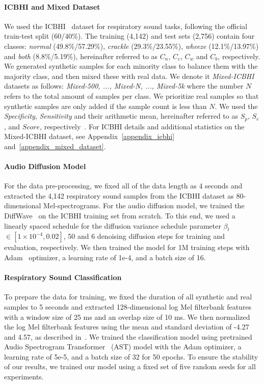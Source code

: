 \documentclass{article}
\begin{document}
\paragraph{ICBHI and Mixed Dataset} We used the ICBHI~\cite{rocha2018alpha} dataset for respiratory sound tasks, following the official train-test split (60/40\%). 
The training (4,142) and test sets (2,756) contain four classes: \emph{normal} (49.8\%/57.29\%), \emph{crackle} (29.3\%/23.55\%), \emph{wheeze} (12.1\%/13.97\%) and \emph{both} (8.8\%/5.19\%), hereinafter referred to as $C_{n}$, $C_{c}$, $C_{w}$ and $C_{b}$, respectively.
We generated synthetic samples for each minority class to balance them with the majority class, and then mixed these with real data. We denote it \emph{Mixed-ICBHI} datasets as follows: \emph{Mixed-500, ..., Mixed-N, ..., Mixed-5k} where the number $N$ refers to the total amount of samples per class. 
We prioritize real samples so that synthetic samples are only added if the sample count is less than $N$.
We used the \emph{Specificity}, \emph{Sensitivity} and their arithmetic mean, hereinafter referred to as $S_{p}$, $S_{e}$, and $Score$, respectively~\cite{rocha2018alpha}. For ICBHI details and additional statistics on the Mixed-ICBHI dataset, see Appendix~\ref{appendix_icbhi} and~\ref{appendix_mixed_dataset}.

\paragraph{Audio Diffusion Model}
For the data pre-processing, we fixed all of the data length as 4 seconds and extracted the 4,142 respiratory sound samples from the ICBHI dataset as 80-dimensional Mel-spectrograms. For the audio diffusion model, we trained the DiffWave~\cite{kochetov2020generative} on the ICBHI training set from scratch. To this end, we used a linearly spaced schedule for the diffusion variance schedule parameter $\beta_{t}$ $\in [1\times10^{-4}, 0.02]$, 50 and 6 denoising diffusion steps for training and evaluation, respectively. We then trained the model for 1M training steps with Adam~\cite{kingma2014adam} optimizer, a learning rate of 1e-4, and a batch size of 16. 

\paragraph{Respiratory Sound Classification} To prepare the data for training, we fixed the duration of all synthetic and real samples to 5 seconds and extracted 128-dimensional log Mel filterbank features with a window size of 25 ms and an overlap size of 10 ms. We then normalized the log Mel filterbank features using the mean and standard deviation of -4.27 and 4.57, as described in~\cite{bae23b_interspeech}. We trained the classification model using pretrained Audio Spectrogram Transformer~\cite{gong21b_interspeech} (AST) model with the Adam optimizer, a learning rate of 5e-5, and a batch size of 32 for 50 epochs. To ensure the stability of our results, we trained our model using a fixed set of five random seeds for all experiments. 
\end{document}
